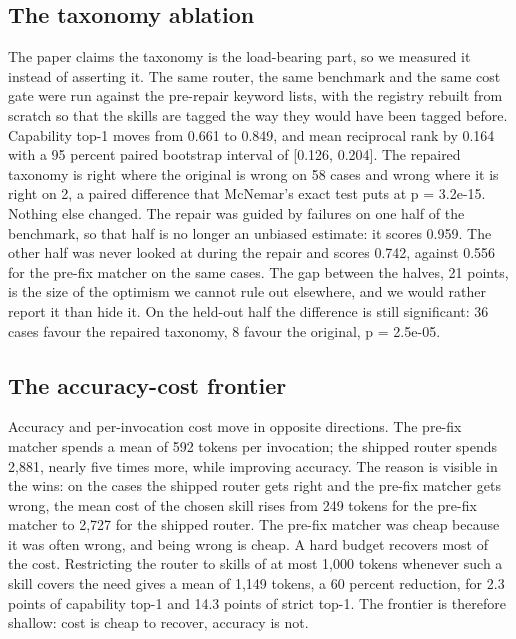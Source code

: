 \documentclass[sigconf,acmsmall]{acmart}
\begin{document}
\subsection{The taxonomy ablation}
The paper claims the taxonomy is the load-bearing part, so we measured it instead of asserting it. The same router, the same benchmark and the same cost gate were run against the pre-repair keyword lists, with the registry rebuilt from scratch so that the skills are tagged the way they would have been tagged before. Capability top-1 moves from 0.661 to 0.849, and mean reciprocal rank by 0.164 with a 95 percent paired bootstrap interval of [0.126, 0.204]. The repaired taxonomy is right where the original is wrong on 58 cases and wrong where it is right on 2, a paired difference that McNemar's exact test puts at p = 3.2e-15. Nothing else changed.
The repair was guided by failures on one half of the benchmark, so that half is no longer an unbiased estimate: it scores 0.959. The other half was never looked at during the repair and scores 0.742, against 0.556 for the pre-fix matcher on the same cases. The gap between the halves, 21 points, is the size of the optimism we cannot rule out elsewhere, and we would rather report it than hide it. On the held-out half the difference is still significant: 36 cases favour the repaired taxonomy, 8 favour the original, p = 2.5e-05.

\subsection{The accuracy-cost frontier}
Accuracy and per-invocation cost move in opposite directions. The pre-fix matcher spends a mean of 592 tokens per invocation; the shipped router spends 2,881, nearly five times more, while improving accuracy. The reason is visible in the wins: on the cases the shipped router gets right and the pre-fix matcher gets wrong, the mean cost of the chosen skill rises from 249 tokens for the pre-fix matcher to 2,727 for the shipped router. The pre-fix matcher was cheap because it was often wrong, and being wrong is cheap.
A hard budget recovers most of the cost. Restricting the router to skills of at most 1,000 tokens whenever such a skill covers the need gives a mean of 1,149 tokens, a 60 percent reduction, for 2.3 points of capability top-1 and 14.3 points of strict top-1. The frontier is therefore shallow: cost is cheap to recover, accuracy is not.
\end{document}
